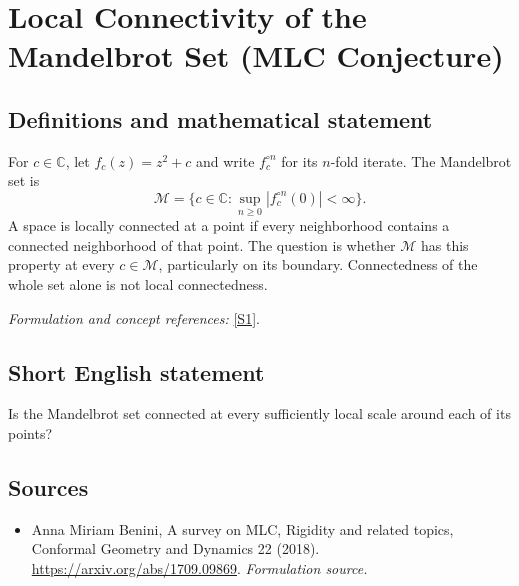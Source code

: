 \documentclass[11pt]{article}
\begin{document}
\section*{\texorpdfstring{Local Connectivity of the Mandelbrot Set (MLC Conjecture)}{Local Connectivity of the Mandelbrot Set (MLC Conjecture)}}\label{127}
\subsection{Definitions and mathematical statement}
For $c\in{\mathbb{C}}$, let $f_c(z)=z^2+c$ and write $f_c^{\circ n}$ for its $n$-fold iterate. The Mandelbrot set is
\[
 \mathcal M=\{c\in{\mathbb{C}}:\sup_{n\ge0}|f_c^{\circ n}(0)|<\infty\}.
\]
A space is locally connected at a point if every neighborhood contains a connected neighborhood of that point. The question is whether $\mathcal M$ has this property at every $c\in\mathcal M$, particularly on its boundary. Connectedness of the whole set alone is not local connectedness.
\par\smallskip\textit{Formulation and concept references:} \href{https://arxiv.org/abs/1709.09869}{[S1]}.

\subsection{Short English statement}
Is the Mandelbrot set connected at every sufficiently local scale around each of its points?
\subsection{Sources}
\begin{itemize}
\item[S1]Anna Miriam Benini, A survey on MLC, Rigidity and related topics, Conformal Geometry and Dynamics 22 (2018).
\url{https://arxiv.org/abs/1709.09869}.
\textit{Formulation source.}
\end{itemize}
\end{document}
